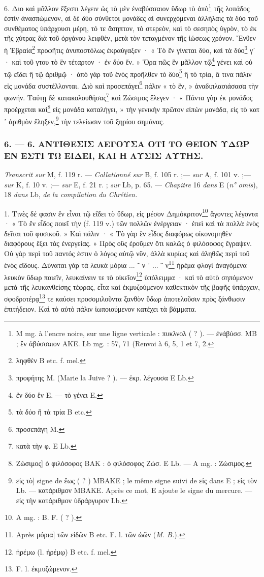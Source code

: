 \documentclass[a4paper, 11pt, oneside, polutonikogreek, french]{article}
\begin{document}
6. Διο καὶ μᾶλλον ἔξεστι λέγειν ὡς τὸ μὲν ἐναβύσσαιον ὕδωρ τὸ ἀπὸ\footnote{M mg. à l'encre noire, sur une ligne verticale : πυκλνολ ( ? ). --- ἐνάβύσσ. MB ; ἓν ἀβύσσαιον AKE. Lb mg. : 57, 71 (Renvoi à 6, 5, 1 et 7, 2.} τῆς λοπάδος ἐστὶν ἀνασπώμενον, αἱ δὲ δύο σύνθετοι μονάδες αἱ συνερχόμεναι ἀλλήλαις τὰ δύο τοῦ συνθέματος ὑπάρχουσι μέρη, τό τε ἄσηπτον, τὸ στερεὸν, καὶ τὸ σεσηπὸς ὑγρὸν, τὸ ἐκ τῆς χύτρας διὰ τοῦ ὀργάνου λειφθὲν, μετὰ τὸν τεταγμένον τῆς ἰώσεως χρόνον. Ἔνθεν ἡ Ἑβραία\footnote{ληφθὲν B etc. f. mel.} προφῆτις ἀνυποστόλως ἐκραύγαξεν · « Τὸ ἓν γίνεται δύο, καὶ τὰ δύο\footnote{προφήτης M. (Marie la Juive ? ). --- ἐκρ. λέγουσα E Lb.} γʹ · καὶ τοῦ γτου τὸ ἓν τέταρτον · ἐν δύο ἕν. » Ὅρα πῶς ἓν μᾶλλον τῷ\footnote{ἓν δύο ἓν E. --- τὸ γένει E.} γένει καὶ οὐ τῷ εἴδει ἢ τῷ ἀριθμῷ · ἀπὸ γὰρ τοῦ ἑνὸς προῆλθεν τὸ δύο\footnote{τὰ δύο ἢ τὰ τρία B etc.} ἢ τὸ τρία, ἅ τινα πάλιν εἰς μονάδα συστέλλονται. Διὸ καὶ προσεπάγει\footnote{προσεπάγη M.} πάλιν « τὸ ἓν, » ἀναδιπλασιάσασα τὴν φωνήν. Ταύτῃ δὲ κατακολουθήσας\footnote{κατὰ τὴν φ. E Lb.} καὶ Ζώσιμος ἔλεγεν · « Πάντα γὰρ ἐκ μονάδος προέρχεται καὶ\footnote{Ζώσιμος] ὁ φιλόσοφος BAK : ὁ φιλόσοφος Ζώσ. E Lb. --- A mg. : Ζώσιμος.} εἰς μονάδα καταλήγει, » τὴν γενικὴν πρῶτον εἰπὼν μονάδα, εἰς τὸ κατ ᾽ ἀριθμὸν ἔληξεν,\footnote{εἰς τὸ] signe de ἕως ( ? ) MBAKE ; le même signe suivi de εἰς dans E ; εἰς τὸν Lb. --- κατάριθμον MBAKE. Après ce mot, E ajoute le signe du mercure. --- εἰς τὴν κατάριθμον ὑδράργυρον Lb.} τὴν τελείωσιν τοῦ ξηρίου σημάνας.

\bigskip
\centerline{\EightStarTaper}
\centerline{\EightStarTaper\EightStarTaper}
\bigskip

\subsubsection{6. --- 6. ΑΝΤΙΘΕΣΙΣ ΛΕΓΟΥΣΑ ΟΤΙ ΤΟ ΘΕΙΟΝ ΥΔΩΡ ΕΝ ΕΣΤΙ ΤΩ ΕΙΔΕΙ, ΚΑΙ Η ΛΥΣΙΣ ΑΥΤΗΣ.}

\emph{Transcrit sur} M, f. 119 r. --- \emph{Collationné sur} B, f. 105 r. ;--- \emph{sur} A, f. 101 v. ;--- \emph{sur} K, f. 10 v. ;--- \emph{sur} E, f. 21 r. ; \emph{sur} Lb, p. 65. --- \emph{Chapitre} 16 \emph{dans} E (\emph{n° omis}), 18 \emph{dans} Lb, \emph{de la compilation du Chrétien.}

1. Τινὲς δέ φασιν ἓν εἶναι τῷ εἴδει τὸ ὕδωρ, εἰς μέσον Δημόκριτον\footnote{A mg. : B. F. ( ? ).} ἄγοντες λέγοντα · « Τὸ ἓν εἶδος ποιεῖ τὴν (f. 119 v.) τῶν πολλῶν ἐνέργειαν · ἐπεὶ καὶ τὰ πολλὰ ἑνὸς δεῖται τοῦ φυσικοῦ. » Καὶ πάλιν · « Τὸ γὰρ ἓν εἶδος διαφόρως οἰκονομηθὲν διαφόρους ἕξει τὰς ἐνεργείας. » Πρὸς οὓς ἐροῦμεν ὅτι καλῶς ὁ φιλόσοφος ἔγραψεν. Οὐ γὰρ περὶ τοῦ παντός ἐστιν ὁ λόγος αὐτῷ νῦν, ἀλλὰ κυρίως καὶ ἀληθῶς περὶ τοῦ ἑνὸς εἴδους. Δύναται γὰρ τὰ λευκὰ μόρια ... ῀ ν ᾽ ... ῀ ν\footnote{Après μόρια] τῶν εἰδῶν B etc. F. l. τῶν ὠῶν (\emph{M. B.}).} ἠρέμα φλογὶ ἀναγόμενα λευκὸν ὕδωρ ποιεῖν, λευκαίνειν τε τὸ οἰκεῖον\footnote{ἠρέμω (l. ἠρέμῳ) B etc. f. mel.} ὑπόλειμμα · καὶ τὸ αὐτὸ σηπόμενον μετὰ τῆς λευκανθείσης τέφρας, εἶτα καὶ ἐκμυζούμενον καθεκτικὸν τῆς βαφῆς ὑπάρχειν, σφοδροτέρᾳ\footnote{F. l. ἐκμυζώμενον.} τε καύσει προσομιλοῦντα ξανθὸν ὕδωρ ἀποτελοῦσιν πρὸς ξάνθωσιν ἐπιτήδειον. Καὶ τὸ αὐτὸ πάλιν ἰωποιούμενον κατέχει τὰ βάμματα.
\end{document}
